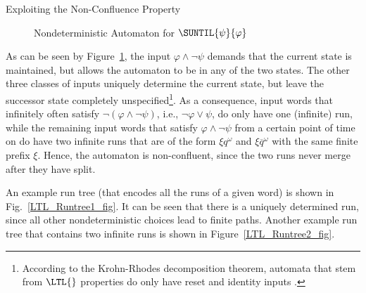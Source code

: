 \documentclass[copyright,creativecommons]{eptcs}
\begin{document}
\begin{section}{Exploiting the Non-Confluence Property}
\begin{figure}
\caption{Nondeterministic Automaton for $\SUNTIL{\psi}{\varphi}$}
\label{fig:LTLtranslate1}
\end{figure}

As can be seen by Figure~\ref{fig:LTLtranslate1}, the input $\varphi\wedge\neg\psi$ demands that the current state is maintained, but allows the automaton to be in any of the two states. The other three classes of inputs uniquely determine the current state, but leave the successor state completely unspecified\footnote{According to the Krohn-Rhodes decomposition theorem, automata that stem from $\LTL{}$ properties do only have reset and identity inputs \cite{Schn03}.}. As a consequence, input words that infinitely often satisfy $\neg(\varphi\wedge\neg\psi)$, i.e., $\neg\varphi\vee\psi$, do only have one (infinite) run, while the remaining input words that satisfy $\varphi\wedge\neg\psi$ from a certain point of time on do have two infinite runs that are of the form $\xi{q}^\omega$ and $\xi\overline{q}^\omega$ with the same finite prefix $\xi$. Hence, the automaton is non-confluent, since the
two runs never merge after they have split.

An example run tree (that encodes all the runs of a given word) is shown in Fig.~\ref{LTL_Runtree1_fig}. It can be seen that there is a uniquely determined run, since all other nondeterministic choices lead to finite paths. Another example run tree that contains two infinite runs is shown in Figure~\ref{LTL_Runtree2_fig}.


\end{section}
\end{document}
